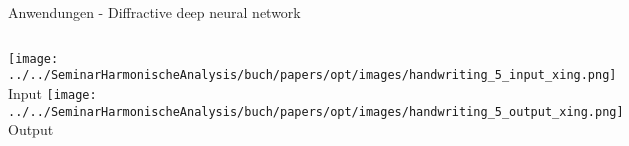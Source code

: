 \begin{frame}{Anwendungen - Diffractive deep neural network}
    \centering
    \begin{columns}
        \texttt{[image: ../../SeminarHarmonischeAnalysis/buch/papers/opt/images/handwriting\_5\_input\_xing.png]}
        Input
        \texttt{[image: ../../SeminarHarmonischeAnalysis/buch/papers/opt/images/handwriting\_5\_output\_xing.png]}
        Output
    \end{columns}
\end{frame}


